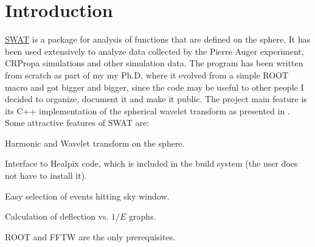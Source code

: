 \documentclass[12pt]{article}
\begin{document}
  \vfill


\newpage
\tableofcontents

\section{Introduction} \label{ch::Introduction}

\href{http://www.ifi.unicamp.br/~mzimbres}{SWAT} is a package for analysis of
functions that are defined on the sphere. It has been used extensively to
analyze data collected by the Pierre Auger experiment, CRPropa simulations and
other simulation data. The program has been written from scratch as part of my
my Ph.D, where it evolved from a simple ROOT macro and got bigger and bigger,
since the code may be useful to other people I decided to organize, document it
and make it public. The project main feature is its C++ implementation of the
spherical wavelet transform as presented in \cite{wiaux}.  Some attractive
features of SWAT are:

\begin{list}{}{}
\item Harmonic and Wavelet transform on the sphere.
\item Interface to Healpix code, which is included in the build system (the user
does not have to install it).
\item Easy selection of events hitting sky window. 
\item Calculation of deflection vs. $1/E$ graphs.
\item ROOT and FFTW are the only prerequisites.
\end{list}
\end{document}
